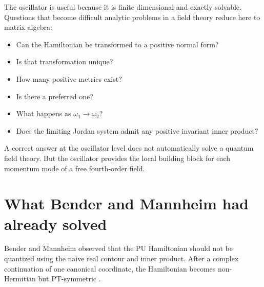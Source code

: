 \documentclass[11pt]{article}
\theoremstyle{remark}
\newcommand{\w}{\omega}
\begin{document}
The oscillator is useful because it is finite dimensional and exactly
solvable.  Questions that become difficult analytic problems in a field
theory reduce here to matrix algebra:
\begin{itemize}
\item Can the Hamiltonian be transformed to a positive normal form?
\item Is that transformation unique?
\item How many positive metrics exist?
\item Is there a preferred one?
\item What happens as $\w_1\to\w_2$?
\item Does the limiting Jordan system admit any positive invariant inner
product?
\end{itemize}
A correct answer at the oscillator level does not automatically solve a
quantum field theory.  But the oscillator provides the local building
block for each momentum mode of a free fourth-order field.

\section{What Bender and Mannheim had already solved}\label{sec:bm}

Bender and Mannheim \cite{BM2008PRL,BM2008PRD} observed that the PU
Hamiltonian should not be quantized using the naive real contour and
inner product.  After a complex continuation of one canonical coordinate,
the Hamiltonian becomes non-Hermitian but PT-symmetric
\cite{BenderBoettcher}.
\end{document}

